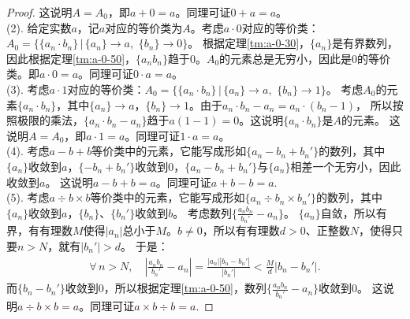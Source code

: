 \documentclass[12pt,UTF8]{ctexbook}
\begin{document}
\begin{appendix}
\begin{proof}
    这说明$A = A_0$，即$a + 0 = a$。同理可证$0+a=a$。\\
    (2). 给定实数$a$，记$a$对应的等价类为$A$。考虑$a\cdot 0$对应的等价类：$A_0 = \{ \{a_n \cdot b_n\} \,|\, \{a_n\}\to a, \,\, \{b_n\} \to 0 \}$。
    根据定理\ref{tm:a-0-30}，$\{a_n\}$是有界数列，因此根据定理\ref{tm:a-0-50}，$\{a_nb_n\}$趋于$0$。$A_0$的元素总是无穷小，因此是$0$的等价类。即$a \cdot 0 = a$。同理可证$0\cdot a=a$。\\
    (3). 考虑$a\cdot 1$对应的等价类：$A_0 = \{\{a_n \cdot b_n\} \,|\, \{a_n\}\to a, \,\, \{b_n\} \to 1 \}$。
    考虑$A_0$的元素$\{a_n \cdot b_n\}$，其中$\{a_n\}\to a$，$\{b_n\} \to 1$。由于$a_n \cdot b_n - a_n = a_n \cdot (b_n - 1)$，
    所以按照极限的乘法，$\{a_n \cdot b_n - a_n\}$趋于$a(1 - 1) = 0$。这说明$\{a_n \cdot b_n\}$是$A$的元素。
    这说明$A = A_0$，即$a \cdot 1 = a$。同理可证$1 \cdot a = a$。\\
    (4). 考虑$a - b + b$等价类中的元素，它能写成形如$\{a_n - b_n + b_n'\}$的数列，其中$\{a_n\}$收敛到$a$，$\{- b_n + b_n'\}$收敛到$0$，$\{a_n - b_n + b_n'\}$与$\{a_n\}$相差一个无穷小，因此收敛到$a$。
    这说明$a - b + b = a$。同理可证$a + b - b = a.$\\
    (5). 考虑$a \div b \times b$等价类中的元素，它能写成形如$\{a_n \div b_n \times b_n'\}$的数列，其中$\{a_n\}$收敛到$a$，$\{b_n\}$、$\{b_n'\}$收敛到$b$。
    考虑数列$\{\frac{a_n b_n}{b_n'} - a_n\}$。
    $\{a_n\}$自敛，所以有界，有有理数$M$使得$|a_n|$总小于$M$。$b\neq 0$，所以有有理数$d>0$、正整数$N$，使得只要$n>N$，就有$|b_n'| > d$。
    于是：
    \begin{align*}
       \forall\,n>N,\quad \left|\frac{a_n b_n}{b_n'} - a_n\right| = \frac{\left|a_n\right| \left|b_n - b_n'\right|}{\left|b_n'\right|}  < \frac{M}{d}\left|b_n - b_n'\right|. 
    \end{align*}
    而$\{b_n - b_n'\}$收敛到$0$，所以根据定理\ref{tm:a-0-50}，数列$\{\frac{a_n b_n}{b_n'} - a_n\}$收敛到$0$。
    这说明$a \div b \times b = a$。同理可证$a\times b \div b = a.$
\end{proof}


\end{appendix}
\end{document}
